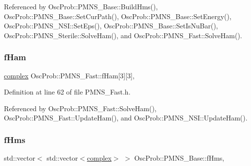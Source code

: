 Referenced by Osc\+Prob\+::\+P\+M\+N\+S\+\_\+\+Base\+::\+Build\+Hms(), Osc\+Prob\+::\+P\+M\+N\+S\+\_\+\+Base\+::\+Set\+Cur\+Path(), Osc\+Prob\+::\+P\+M\+N\+S\+\_\+\+Base\+::\+Set\+Energy(), Osc\+Prob\+::\+P\+M\+N\+S\+\_\+\+N\+S\+I\+::\+Set\+Eps(), Osc\+Prob\+::\+P\+M\+N\+S\+\_\+\+Base\+::\+Set\+Is\+Nu\+Bar(), Osc\+Prob\+::\+P\+M\+N\+S\+\_\+\+Sterile\+::\+Solve\+Ham(), and Osc\+Prob\+::\+P\+M\+N\+S\+\_\+\+Fast\+::\+Solve\+Ham().

\mbox{\label{classOscProb_1_1PMNS__Fast_aab37f2a7f59ab7026a8a21a561115dd0}} 
\subsubsection{\texorpdfstring{f\+Ham}{fHam}}
{\footnotesize\ttfamily \hyperlink{classOscProb_1_1PMNS__Base_ae86ec4718808ce9d02e5f5b4226714ab}{complex} Osc\+Prob\+::\+P\+M\+N\+S\+\_\+\+Fast\+::f\+Ham\mbox{[}3\mbox{]}\mbox{[}3\mbox{]}\hspace{0.3cm}{\ttfamily [protected]}, {\ttfamily [inherited]}}



Definition at line 62 of file P\+M\+N\+S\+\_\+\+Fast.\+h.



Referenced by Osc\+Prob\+::\+P\+M\+N\+S\+\_\+\+Fast\+::\+Solve\+Ham(), Osc\+Prob\+::\+P\+M\+N\+S\+\_\+\+Fast\+::\+Update\+Ham(), and Osc\+Prob\+::\+P\+M\+N\+S\+\_\+\+N\+S\+I\+::\+Update\+Ham().

\mbox{\label{classOscProb_1_1PMNS__Base_adf5901166216e8c7a5cff2092952f473}} 
\subsubsection{\texorpdfstring{f\+Hms}{fHms}}
{\footnotesize\ttfamily std\+::vector$<$ std\+::vector$<$\hyperlink{classOscProb_1_1PMNS__Base_ae86ec4718808ce9d02e5f5b4226714ab}{complex}$>$ $>$ Osc\+Prob\+::\+P\+M\+N\+S\+\_\+\+Base\+::f\+Hms\hspace{0.3cm}{\ttfamily [protected]}, {\ttfamily [inherited]}}



